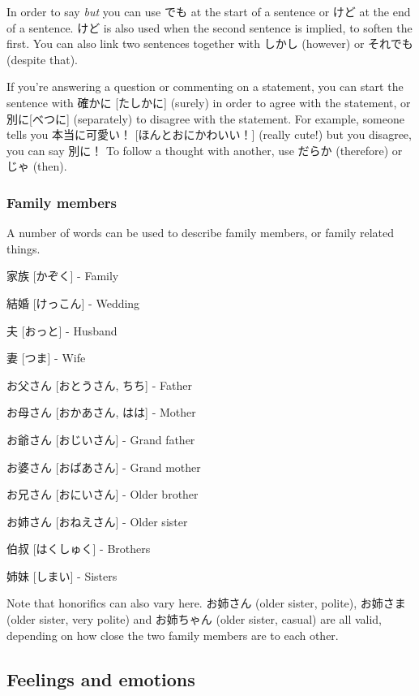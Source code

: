 \documentclass{article}
\begin{document}
\begin{CJK}{UTF8}{min}
\begin{multicols*}{3}
In order to say \textit{but} you can use でも at the start of a sentence or けど at the end of a sentence. けど is also used when the second sentence is implied, to soften the first. 
You can also link two sentences together with しかし (however) or それでも (despite that).

If you're answering a question or commenting on a statement, you can start the sentence with 確かに [たしかに] (surely) in order to agree with the statement, or 別に[べつに] 
(separately) to disagree with the statement. For example, someone tells you 本当に可愛い！ [ほんとおにかわいい！] (really cute!) but you disagree, you can say 別に！ To follow a 
thought with another, use だらか (therefore) or じゃ (then).

\subsubsection{Family members}

A number of words can be used to describe family members, or family related things.

\begin{colorize}
\item 家族 [かぞく] - Family
\item 結婚 [けっこん] - Wedding
\item 夫 [おっと] - Husband
\item 妻 [つま] - Wife
\item お父さん [おとうさん, ちち] - Father
\item お母さん [おかあさん, はは] - Mother
\item お爺さん [おじいさん] - Grand father
\item お婆さん [おばあさん] - Grand mother
\item お兄さん [おにいさん] - Older brother
\item お姉さん [おねえさん] - Older sister
\item 伯叔 [はくしゅく] - Brothers
\item 姉妹 [しまい] - Sisters
\end{colorize}

Note that honorifics can also vary here. お姉さん (older sister, polite), お姉さま (older sister, very polite) and お姉ちゃん (older sister, casual) are all valid, depending on how 
close the two family members are to each other.

\subsection{Feelings and emotions}


\end{multicols*}
\end{CJK}
\end{document}
